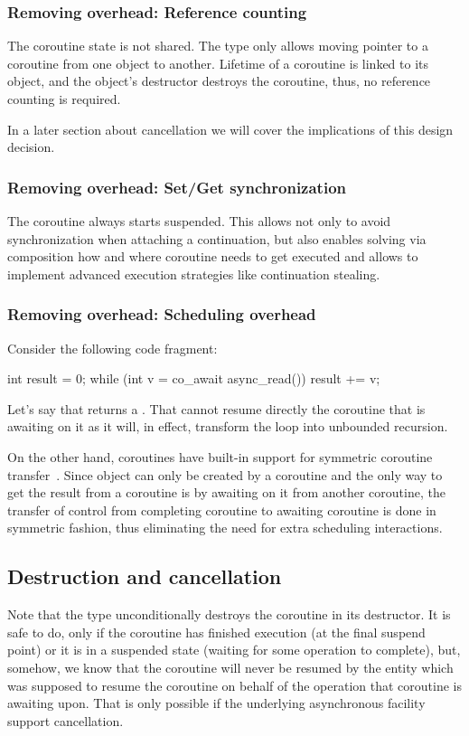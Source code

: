 \subsubsection{Removing  overhead: Reference counting}

The coroutine state is not shared. The  type only allows moving pointer to a coroutine from one  object to another. Lifetime of a coroutine is linked to its  object, and the  object's destructor destroys the coroutine, thus, no reference counting is required.

In a later section about cancellation we will cover the implications of this design decision.

\subsubsection{Removing  overhead: Set/Get synchronization}

The  coroutine always starts suspended. This allows not only to avoid synchronization when attaching a continuation, but also enables solving via composition how and where coroutine needs to get executed and allows to implement advanced execution strategies like continuation stealing.

\subsubsection{Removing  overhead: Scheduling overhead}
Consider the following code fragment:
\begin{codeblock}
int result = 0;
while (int v = co_await async_read())
  result += v;
\end{codeblock}
Let's say that  returns a . That  cannot resume directly the coroutine that is awaiting on it as it will, in effect, transform the loop into unbounded recursion.

On the other hand, coroutines have built-in support for symmetric coroutine transfer~\cite{p0913r1}. Since  object can only be created by a coroutine and the only way to get the result from a coroutine is by awaiting on it from another coroutine, the transfer of control from completing coroutine to awaiting coroutine is done in symmetric fashion, thus eliminating the need for extra scheduling interactions.

\subsection{Destruction and cancellation}
Note that the  type unconditionally destroys the coroutine in its destructor. It is safe to do, only if the coroutine has finished execution (at the final suspend point) or it is in a suspended state (waiting for some operation to complete), but, somehow, we know that the coroutine will never be resumed by the entity which was supposed to resume the coroutine on behalf of the operation that coroutine is awaiting upon. That is only possible if the underlying asynchronous facility support cancellation.

